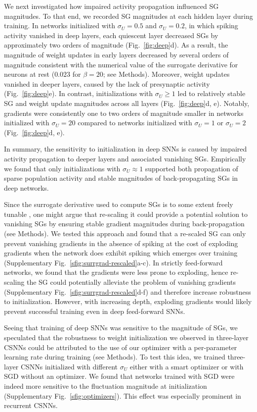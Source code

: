 \documentclass[11pt,a4paper]{article}
\begin{document}
We next investigated how impaired activity propagation influenced \ac{SG} magnitudes.
To that end, we recorded \ac{SG} magnitudes at each hidden layer during training.
In networks initialized with $\sigma_U = 0.5$ and $\sigma_U = 0.2$, in which spiking activity vanished in deep layers, each quiescent layer decreased \acp{SG} by approximately two orders of magnitude (Fig.~\ref{fig:deep}d). 
As a result, the magnitude of weight updates in early layers decreased by several orders of magnitude consistent with the numerical value of the surrogate derivative for neurons at rest ($0.023$ for $\beta=20$; see Methods).
Moreover, weight updates vanished in deeper layers, caused by the lack of presynaptic activity (Fig.~\ref{fig:deep}e).
In contrast, initializations with $\sigma_U \geq 1$ led to relatively stable \ac{SG} and weight update magnitudes across all layers (Fig.~\ref{fig:deep}d, e). 
Notably, gradients were consistently one to two orders of magnitude smaller in networks initialized with $\sigma_U = 20$ compared to networks initialized with $\sigma_U = 1$ or $\sigma_U = 2$ (Fig.~\ref{fig:deep}d, e).

In summary, the sensitivity to initialization in deep \acp{SNN} is caused by impaired activity propagation to deeper layers and associated vanishing \acp{SG}.
Empirically we found that only initializations with $\sigma_U \approx 1$ supported both propagation of sparse population activity and stable magnitudes of back-propagating \acp{SG} in deep networks.

Since the surrogate derivative used to compute \acp{SG} is to some extent freely tunable \citep{Zenke2021-zg}, one might argue that re-scaling it could provide a potential solution to vanishing \acp{SG} by ensuring stable gradient magnitudes during back-propagation (see Methods).
We tested this approach and found that a re-scaled \ac{SG} can only prevent vanishing gradients in the absence of spiking at the cost of exploding gradients when the network does exhibit spiking which emerges over training (Supplementary Fig.~\ref{sfig:surrgrad-rescaled}a-c).
In strictly feed-forward networks, we found that the gradients were less prone to exploding, hence re-scaling the \ac{SG} could potentially alleviate the problem of vanishing gradients (Supplementary Fig.~\ref{sfig:surrgrad-rescaled}d-f) and therefore increase robustness to
initialization. 
However, with increasing depth, exploding gradients would likely prevent successful training even in deep feed-forward \acp{SNN}.

Seeing that training of deep \acp{SNN} was sensitive to the magnitude of \acp{SG},
we speculated that the robustness to weight initialization we observed in three-layer \acp{CSNN} could be
attributed to the use of our optimizer with a per-parameter learning
rate during training (see Methods).
To test this idea, we trained three-layer \acp{CSNN} initialized with different $\sigma_U$
either with a smart optimizer \citep{Funk2015-xl} or with \ac{SGD} without an
optimizer.
We found that networks trained with \ac{SGD} were indeed more sensitive to the
fluctuation magnitude at initialization (Supplementary Fig.~\ref{sfig:optimizers}).
This effect was especially prominent in recurrent \acp{CSNN}.
\end{document}
